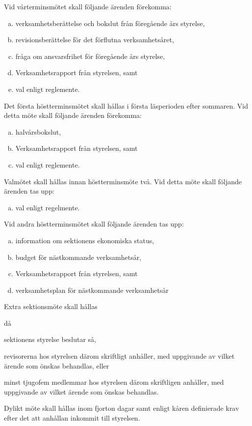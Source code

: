 \documentclass[stadgar]{dsekprotokoll}
\begin{document}
\begin{stadgeavsnitt}

Vid vårterminsmötet skall följande ärenden förekomma:
\begin{enumerate}[a)]
\item verksamhetsberättelse och bokslut från föregående års styrelse,
\item revisionsberättelse för det förflutna verksamhetsåret,
\item fråga om ansvarsfrihet för föregående års styrelse, 
\item Verksamhetsrapport från styrelsen, samt
\item val enligt reglemente.
\end{enumerate}


Det första höstterminsmötet skall hållas i första läsperioden efter sommaren. Vid detta möte skall följande ärenden förekomma:
\begin{enumerate}[a)]
\item halvårsbokslut, 
\item Verksamhetsrapport från styrelsen, samt
\item val enligt reglemente.
\end{enumerate}


Valmötet skall hållas innan höstterminsmöte två. Vid detta möte skall följande ärenden tas upp:
\begin{enumerate}[a)]
\item val enligt regelmente. 
\end{enumerate}


Vid andra höstterminsmötet skall följande ärenden tas upp:
\begin{enumerate}[a)]
\item information om sektionens ekonomiska status,
\item budget för nästkommande verksamhetsår, 
\item Verksamhetsrapport från styrelsen, samt
\item verksamhetsplan för nästkommande verksamhetsår
\end{enumerate}


Extra sektionsmöte skall hållas
\begin{fetlista}{då}
\item sektionens styrelse beslutar så,
\item revisorerna hos styrelsen därom skriftligt anhåller, med
  uppgivande av vilket ärende som önskas behandlas, eller
\item minst tjugofem medlemmar hos styrelsen därom skriftligen
  anhåller, med uppgivande av vilket ärende som önskas behandlas.
\end{fetlista}

Dylikt möte skall hållas inom fjorton dagar samt enligt kåren definierade krav efter det att anhållan inkommit till styrelsen.


\end{stadgeavsnitt}
\end{document}
